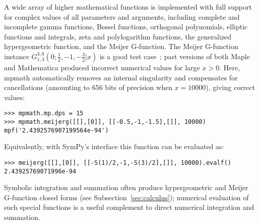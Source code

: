 A wide array of higher mathematical functions is implemented
with full support for complex values of all parameters and arguments,
including complete and incomplete gamma functions,
Bessel functions, orthogonal polynomials, elliptic functions and integrals,
zeta and polylogarithm functions,
the generalized hypergeometric function, and the Meijer G-function.
The Meijer G-function instance
$G_{1, 3}^{3, 0}\left(0 ; \tfrac{1}{2}, -1, - \tfrac{3}{2} | x \right)$
is a good test case~\cite{Toth2007}; past versions of both Maple and
Mathematica produced incorrect numerical values for large $x > 0$.
Here, mpmath automatically removes an internal singularity
and compensates for cancellations (amounting to 656 bits
of precision when $x = 10000$), giving correct values:
\begin{verbatim}
>>> mpmath.mp.dps = 15
>>> mpmath.meijerg([[],[0]], [[-0.5,-1,-1.5],[]], 10000)
mpf('2.4392576907199564e-94')
\end{verbatim}

Equivalently, with SymPy's interface this function can be evaluated as:
\begin{verbatim}
>>> meijerg([[],[0]], [[-S(1)/2,-1,-S(3)/2],[]], 10000).evalf()
2.43925769071996e-94
\end{verbatim}

Symbolic integration and summation often produce hypergeometric
and Meijer G-function closed forms (see Subsection~\ref{sec:calculus});
numerical evaluation of such special functions is a useful complement
to direct numerical integration and summation.
